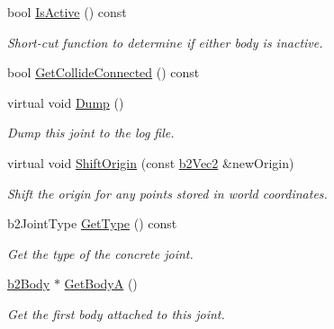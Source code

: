 \begin{DoxyCompactItemize}
\mbox{\label{classb2Joint_ae9cfbd158216c9855c2f018ff3c9c922}} 
bool \hyperlink{classb2Joint_ae9cfbd158216c9855c2f018ff3c9c922}{Is\+Active} () const
\begin{DoxyCompactList}\small\item\em Short-\/cut function to determine if either body is inactive. \end{DoxyCompactList}\item 
bool \hyperlink{classb2Joint_a48492903df96c8a7b8cad8ed826f8cb0}{Get\+Collide\+Connected} () const
\item 
\mbox{\label{classb2Joint_abd35e7316017ad9a40d5dbf9b5ba3f36}} 
virtual void \hyperlink{classb2Joint_abd35e7316017ad9a40d5dbf9b5ba3f36}{Dump} ()
\begin{DoxyCompactList}\small\item\em Dump this joint to the log file. \end{DoxyCompactList}\item 
\mbox{\label{classb2Joint_a7804f649e993dc0fd9ae47fde5601f90}} 
virtual void \hyperlink{classb2Joint_a7804f649e993dc0fd9ae47fde5601f90}{Shift\+Origin} (const \hyperlink{structb2Vec2}{b2\+Vec2} \&new\+Origin)
\begin{DoxyCompactList}\small\item\em Shift the origin for any points stored in world coordinates. \end{DoxyCompactList}\item 
\mbox{\label{classb2Joint_ac56eef62fe1ac7c9e5e21a79fb035255}} 
b2\+Joint\+Type \hyperlink{classb2Joint_ac56eef62fe1ac7c9e5e21a79fb035255}{Get\+Type} () const
\begin{DoxyCompactList}\small\item\em Get the type of the concrete joint. \end{DoxyCompactList}\item 
\mbox{\label{classb2Joint_a87e8af23f44417f740ba9e66e4854032}} 
\hyperlink{classb2Body}{b2\+Body} $\ast$ \hyperlink{classb2Joint_a87e8af23f44417f740ba9e66e4854032}{Get\+BodyA} ()
\begin{DoxyCompactList}\small\item\em Get the first body attached to this joint. \end{DoxyCompactList}\item 

\end{DoxyCompactItemize}
